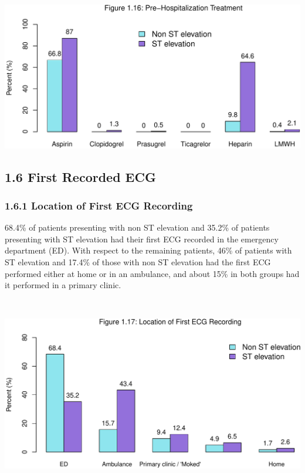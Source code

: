 \documentclass[
]{article}
\begin{document}
\includegraphics{ACSIS_2024_v1_pdf_files/figure-latex/unnamed-chunk-55-1.pdf}

\pagebreak

\subsection{1.6 First Recorded ECG}\label{first-recorded-ecg}

\subsubsection{1.6.1 Location of First ECG
Recording}\label{location-of-first-ecg-recording}

68.4\% of patients presenting with non ST elevation and 35.2\% of
patients presenting with ST elevation had their first ECG recorded in
the emergency department (ED). With respect to the remaining patients,
46\% of patients with ST elevation and 17.4\% of those with non ST
elevation had the first ECG performed either at home or in an ambulance,
and about 15\% in both groups had it performed in a primary clinic.

~

\includegraphics{ACSIS_2024_v1_pdf_files/figure-latex/unnamed-chunk-56-1.pdf}
\end{document}
